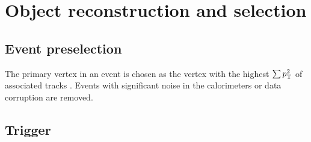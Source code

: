 \section{Object reconstruction and selection}
\label{sec:objselec}

\subsection{Event preselection}
\label{subsec:eventpreselec}

The primary vertex in an event is chosen as the vertex with the highest $\sum p_{\mathrm{T}}^2$ of associated tracks \cite{ATL-PHYS-PUB-2015-026}.  Events with significant noise in the calorimeters or data corruption are removed. 

\subsection{Trigger}
\label{subsec:trigger}
